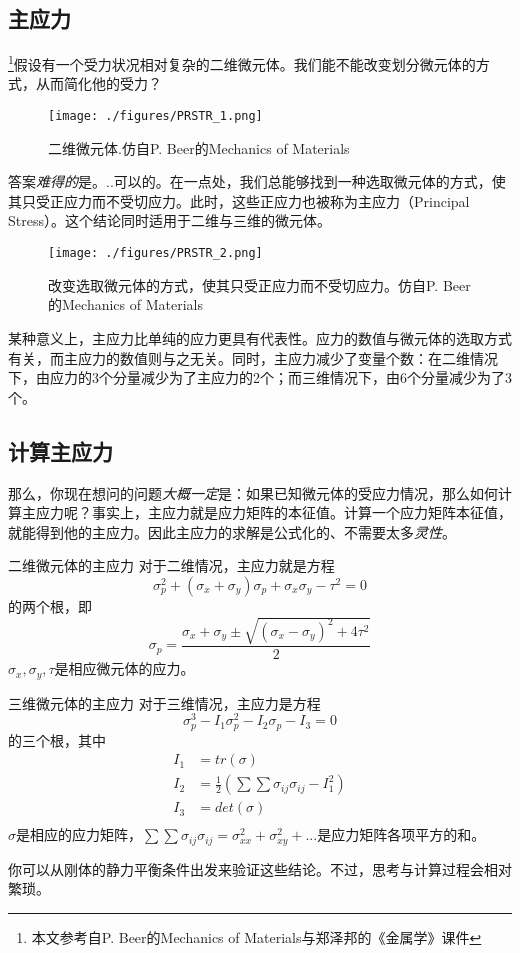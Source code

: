 

\subsection{主应力}
\footnote{本文参考自P. Beer的Mechanics of Materials与郑泽邦的《金属学》课件}假设有一个受力状况相对复杂的二维微元体。我们能不能改变划分微元体的方式，从而简化他的受力？
\begin{figure}[ht]
\centering
\texttt{[image: ./figures/PRSTR\_1.png]}
\caption{二维微元体.仿自P. Beer的Mechanics of Materials} \label{PRSTR_fig1}
\end{figure}

答案\textsl{难得的}是。..可以的。在一点处，我们总能够找到一种选取微元体的方式，使其只受正应力而不受切应力。此时，这些正应力也被称为主应力（Principal Stress）。这个结论同时适用于二维与三维的微元体。
\begin{figure}[ht]
\centering
\texttt{[image: ./figures/PRSTR\_2.png]}
\caption{改变选取微元体的方式，使其只受正应力而不受切应力。仿自P. Beer的Mechanics of Materials} \label{PRSTR_fig2}
\end{figure}

某种意义上，主应力比单纯的应力更具有代表性。应力的数值与微元体的选取方式有关，而主应力的数值则与之无关。同时，主应力减少了变量个数：在二维情况下，由应力的3个分量减少为了主应力的2个；而三维情况下，由6个分量减少为了3个。

\subsection{计算主应力}

那么，你现在想问的问题\textsl{大概一定}是：如果已知微元体的受应力情况，那么如何计算主应力呢？事实上，主应力就是应力矩阵的本征值。计算一个应力矩阵本征值，就能得到他的主应力。因此主应力的求解是公式化的、不需要太多\textsl{灵性}。

\begin{example}{二维微元体的主应力}
对于二维情况，主应力就是方程
$$\sigma_p^2+(\sigma_x+\sigma_y)\sigma_p+\sigma_x\sigma_y-\tau^2=0$$
的两个根，即
$$\sigma_p=\frac{\sigma_x+\sigma_y \pm \sqrt{(\sigma_x-\sigma_y)^2+4\tau^2}}{2}$$
$\sigma_x,\sigma_y,\tau$是相应微元体的应力。
\end{example}

\begin{example}{三维微元体的主应力}
对于三维情况，主应力是方程 
$$
\sigma_p^3-I_1\sigma_p^2-I_2\sigma_p-I_3=0
$$
的三个根，其中
$$
\begin{aligned}
I_1&=tr(\sigma)\\
I_2&=\frac{1}{2} ({\sum \sum \sigma_{ij} \sigma_{ij} -I_1^2})\\
I_3&=det(\sigma)\\
\end{aligned}
$$
$\sigma$是相应的应力矩阵，$\sum \sum \sigma_{ij} \sigma_{ij}=\sigma_{xx}^2+\sigma_{xy}^2+...$是应力矩阵各项平方的和。
\end{example}
你可以从刚体的静力平衡条件出发来验证这些结论。不过，思考与计算过程会相对繁琐。
